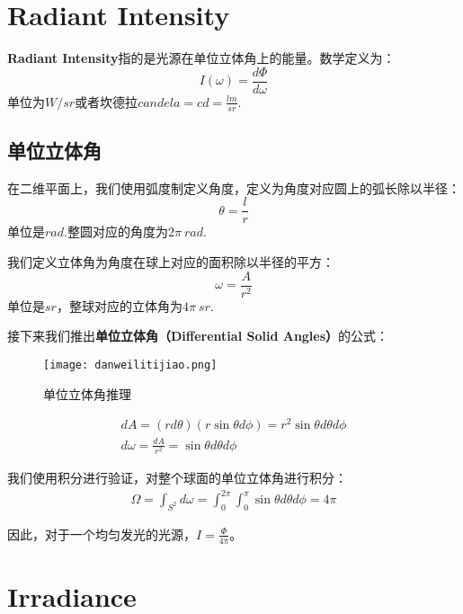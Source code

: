 \documentclass[openany]{progbookcn}
\begin{document}
\section{Radiant Intensity}
\textbf{Radiant Intensity}指的是光源在单位立体角上的能量。数学定义为：
\begin{equation}
	I(\omega)=\frac{d\Phi}{d\omega}
\end{equation} 单位为$W/sr$或者坎德拉$candela=cd=\frac{lm}{sr}$.

\subsection{单位立体角}
在二维平面上，我们使用弧度制定义角度，定义为角度对应圆上的弧长除以半径：
\begin{equation}
	\theta = \frac{l}{r}
\end{equation} 单位是$rad$.整圆对应的角度为$2\pi\ rad$.

我们定义立体角为角度在球上对应的面积除以半径的平方：
\begin{equation}
	\omega=\frac{A}{r^2}
\end{equation} 单位是$sr$，整球对应的立体角为$4\pi\ sr$.

接下来我们推出\textbf{单位立体角（Differential Solid Angles）}的公式：
\begin{figure}[H]
	\centering
	\texttt{[image: danweilitijiao.png]}
	\caption{单位立体角推理}
	\label{fig:dwltj}
\end{figure}

\begin{equation}
\begin{split}
	dA=(rd\theta)(r\sin \theta d \phi)=r^2\sin\theta d\theta d\phi \\
	d\omega=\frac{dA}{r^2}=\sin\theta d\theta d\phi
\end{split}
\end{equation}

我们使用积分进行验证，对整个球面的单位立体角进行积分：
\begin{equation}
	\begin{split}
		\Omega=\int_{S^2}d\omega=\int_{0}^{2\pi}\int_{0}^{\pi}\sin\theta d\theta d\phi = 4\pi
	\end{split}
\end{equation}

因此，对于一个均匀发光的光源，$I=\frac{\Phi}{4\pi}$。

\section{Irradiance}
\end{document}

